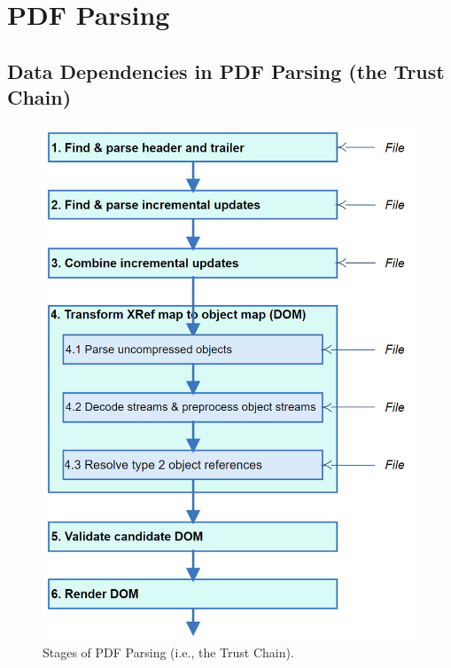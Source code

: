 \section{PDF Parsing}
\label{sec:parsing}


\subsection{Data Dependencies in PDF Parsing (the Trust Chain)}
\label{sec:trust-chain}

\begin{figure}[t]
  \centering
  \includegraphics[width=0.8\linewidth]{figures/Stages.png}
  \caption{Stages of PDF Parsing (i.e., the Trust Chain).}
  \label{fig:pdf-trust-chain}
\end{figure}

